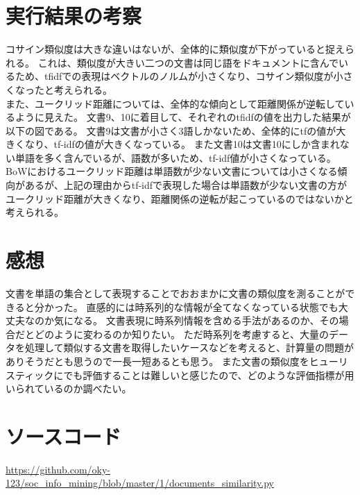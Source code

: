 \documentclass{jsarticle}
\begin{document}
\section{実行結果の考察}

コサイン類似度は大きな違いはないが、全体的に類似度が下がっていると捉えられる。
これは、類似度が大きい二つの文書は同じ語をドキュメントに含んでいるため、tfidfでの表現はベクトルのノルムが小さくなり、コサイン類似度が小さくなったと考えられる。\\
また、ユークリッド距離については、全体的な傾向として距離関係が逆転しているように見えた。
文書9、10に着目して、それぞれのtfidfの値を出力した結果が以下の図である。
文書9は文書が小さく3語しかないため、全体的にtfの値が大きくなり、tf-idfの値が大きくなっている。
また文書10は文書10にしか含まれない単語を多く含んでいるが、語数が多いため、tf-idf値が小さくなっている。
BoWにおけるユークリッド距離は単語数が少ない文書については小さくなる傾向があるが、上記の理由からtf-idfで表現した場合は単語数が少ない文書の方がユークリッド距離が大きくなり、距離関係の逆転が起こっているのではないかと考えられる。

\section{感想}
文書を単語の集合として表現することでおおまかに文書の類似度を測ることができると分かった。
直感的には時系列的な情報が全てなくなっている状態でも大丈夫なのか気になる。
文書表現に時系列情報を含める手法があるのか、その場合だとどのように変わるのか知りたい。
ただ時系列を考慮すると、大量のデータを処理して類似する文書を取得したいケースなどを考えると、計算量の問題がありそうだとも思うので一長一短あるとも思う。
また文書の類似度をヒューリスティックにでも評価することは難しいと感じたので、どのような評価指標が用いられているのか調べたい。

\section{ソースコード}
\url{https://github.com/oky-123/soc_info_mining/blob/master/1/documents_similarity.py}
\end{document}
